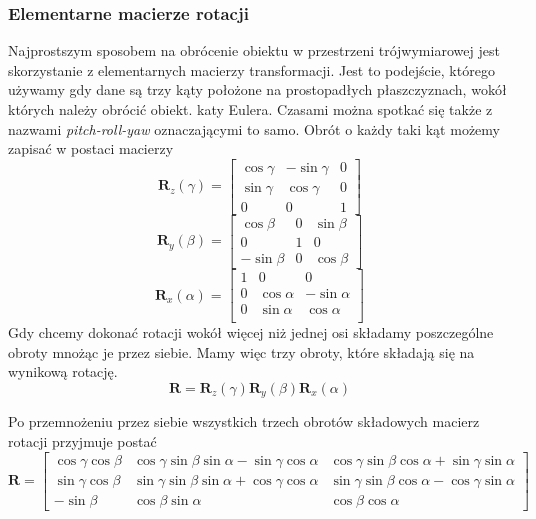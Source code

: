 \documentclass{article}
\begin{document}
\subsubsection*{\Large{Elementarne macierze rotacji}}
Najprostszym sposobem na obrócenie obiektu w przestrzeni trójwymiarowej jest skorzystanie z elementarnych macierzy transformacji. Jest to podejście, którego używamy gdy dane są trzy kąty położone na prostopadłych płaszczyznach, wokół których należy obrócić obiekt. katy Eulera. Czasami można spotkać się także z nazwami \emph{pitch-roll-yaw} oznaczającymi to samo. Obrót o każdy taki kąt możemy zapisać w postaci macierzy
\[
\mathbf{R}_z(\gamma) = \begin{bmatrix}
\cos \gamma & -\sin \gamma & 0 \\
\sin \gamma & \cos \gamma & 0 \\
0 & 0 & 1
\end{bmatrix}
\]
\[
\mathbf{R}_y(\beta) = \begin{bmatrix}
\cos \beta & 0 & \sin \beta \\
0 & 1 & 0 \\
-\sin \beta & 0 & \cos \beta
\end{bmatrix}
\]
\[
\mathbf{R}_x(\alpha) = \begin{bmatrix}
1 & 0 & 0 \\
0 & \cos \alpha & -\sin \alpha \\
0 & \sin \alpha & \cos \alpha \\
\end{bmatrix}
\]
Gdy chcemy dokonać rotacji wokół więcej niż jednej osi składamy poszczególne obroty mnożąc je przez siebie. Mamy więc trzy obroty, które składają się na wynikową rotację.
\[\mathbf{R} = \mathbf{R}_z(\gamma)\mathbf{R}_y(\beta)\mathbf{R}_x(\alpha)\]

Po przemnożeniu przez siebie wszystkich trzech obrotów składowych macierz rotacji przyjmuje postać
\[
\mathbf{R} = \begin{bmatrix}
\cos \gamma \cos \beta & 
\cos \gamma \sin \beta \sin \alpha - \sin \gamma \cos \alpha &
\cos \gamma \sin \beta \cos \alpha + \sin \gamma \sin \alpha \\
\sin \gamma \cos \beta &
\sin \gamma \sin \beta \sin \alpha + \cos \gamma \cos \alpha &
\sin \gamma \sin \beta \cos \alpha - \cos \gamma \sin \alpha \\
-\sin \beta & \cos \beta \sin \alpha & \cos \beta \cos \alpha
\end{bmatrix}
\]
\end{document}
